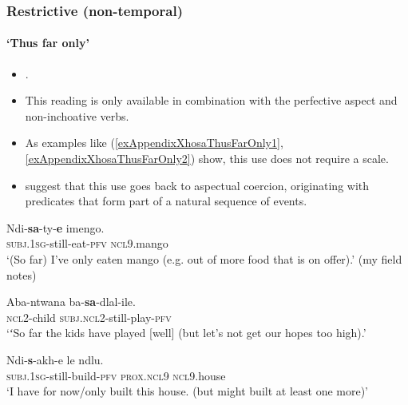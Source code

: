 \subsubsection{Restrictive (non-temporal)}
\paragraph{ \lq Thus far only'}
\label{appendixXhosaRestrictive}
\begin{itemize}
	\item \textcite{CranePersohn2021}.
	\item This reading is only available in combination with the perfective aspect and non-inchoative verbs.
	\item As examples like (\ref{exAppendixXhosaThusFarOnly1}, \ref{exAppendixXhosaThusFarOnly2}) show, this use does not require a scale.
	\item \textcite{CranePersohn2021} suggest that this use goes back to aspectual coercion, originating with predicates that form part of a natural sequence of events.
\end{itemize}

\begin{exe}
	\ex\label{exAppendixXhosaThusFarOnly1}
	\gll Ndi-\textbf{sa}-ty-\textbf{e} imengo.\\
	\textsc{subj}.1\textsc{sg}-still-eat-\textsc{pfv} \textsc{ncl}9.mango\\
	\glt \lq (So far) I've only eaten mango (e.g. out of more food that is on offer).' (my field notes)
	
	\ex\label{exAppendixXhosaThusFarOnly2}
	\gll Aba-ntwana ba-\textbf{sa}-dlal-ile.\\
	\textsc{ncl}2-child \textsc{subj}.\textsc{ncl}2-still-play-\textsc{pfv}\\
	\glt \lq ʻSo far the kids have played [well] (but let’s not get our hopes too high).' \parencite[243]{CranePersohn2021}
		
	\ex
	\gll Ndi-\textbf{s}-akh-e le ndlu.\\
	\textsc{subj}.1\textsc{sg}-still-build-\textsc{pfv} \textsc{prox}.\textsc{ncl}9 \textsc{ncl}9.house\\
	\glt \lq I have for now/only built this house. (but might built at least one more)' \parencite[243]{CranePersohn2021}
\end{exe}

